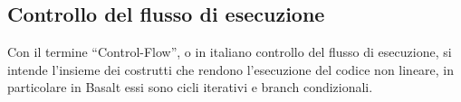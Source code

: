 \subsection{Controllo del flusso di esecuzione}
Con il termine “Control-Flow”, o in italiano controllo del flusso di esecuzione, si intende l’insieme dei costrutti che rendono 
l’esecuzione del codice non lineare, in particolare in Basalt essi sono cicli iterativi e branch condizionali. 

 \newpage
 \newpage
 \newpage
 \newpage
